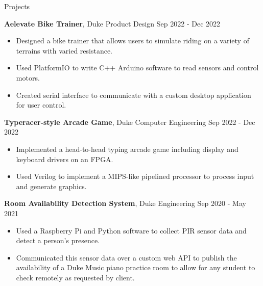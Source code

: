 \documentclass{resume}
\begin{document}
\begin{rSection}{Projects}

\textbf{Aelevate Bike Trainer}, Duke Product Design \hfill{Sep 2022 - Dec 2022}
\begin{itemize}
    \itemsep -3pt {} 
    \item Designed a bike trainer that allows users to simulate riding on a variety of terrains with varied resistance.
    \item Used PlatformIO to write C++ Arduino software to read sensors and control motors.
    \item Created serial interface to communicate with a custom desktop application for user control.
    \end{itemize}

\textbf{Typeracer-style Arcade Game}, Duke Computer Engineering \hfill{Sep 2022 - Dec 2022}
\begin{itemize}
    \itemsep -3pt {} 
    \item Implemented a head-to-head typing arcade game including display and keyboard drivers on an FPGA.
    \item Used Verilog to implement a MIPS-like pipelined processor to process input and generate graphics.
    \end{itemize}

\textbf{Room Availability Detection System}, Duke Engineering \hfill{Sep 2020 - May 2021}
\begin{itemize}
    \itemsep -3pt {} 
    \item Used a Raspberry Pi and Python software to collect PIR sensor data and detect a person's presence.
    \item Communicated this sensor data over a custom web API to publish the availability of a Duke Music piano practice room to allow for any student to check remotely as requested by client.
    \end{itemize}

\end{rSection} 
\end{document}
